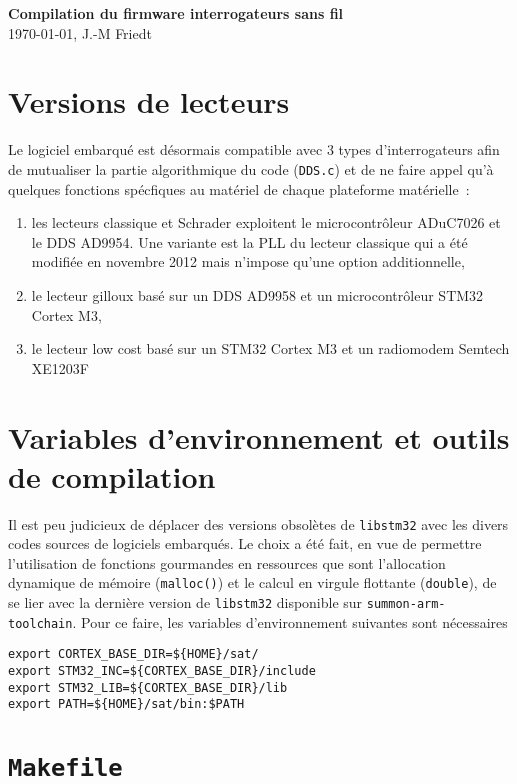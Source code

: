 \documentclass[a4paper]{article}
\begin{document}
\begin{center}
{\Large\bf Compilation du firmware interrogateurs sans fil} \\
\today, J.-M Friedt
\end{center}

\section{Versions de lecteurs}

Le logiciel embarqu\'e est d\'esormais compatible avec 3 types d'interrogateurs afin
de mutualiser la partie algorithmique du code ({\tt DDS.c}) et de ne faire appel
qu'\`a quelques fonctions sp\'ecfiques au mat\'eriel de chaque plateforme mat\'erielle~:
\begin{enumerate}
\item les lecteurs classique et Schrader exploitent le microcontr\^oleur ADuC7026 et le DDS AD9954. Une
variante est la PLL du lecteur classique qui a \'et\'e modifi\'ee en novembre 2012 mais n'impose qu'une option 
additionnelle,
\item le lecteur gilloux bas\'e sur un DDS AD9958 et un microcontr\^oleur STM32 Cortex M3,
\item le lecteur low cost bas\'e sur un STM32 Cortex M3 et un radiomodem Semtech XE1203F
\end{enumerate}

\section{Variables d'environnement et outils de compilation}

Il est peu judicieux de d\'eplacer des versions obsol\`etes de {\tt libstm32} avec les divers
codes sources de logiciels embarqu\'es. Le choix a \'et\'e fait, en vue de permettre l'utilisation
de fonctions gourmandes en ressources que sont l'allocation dynamique de m\'emoire ({\tt malloc()})
et le calcul en virgule flottante ({\tt double}), de se lier avec la derni\`ere version de {\tt libstm32}
disponible sur {\tt summon-arm-toolchain}. Pour ce faire, les variables d'environnement suivantes sont
n\'ecessaires

\begin{verbatim}
export CORTEX_BASE_DIR=${HOME}/sat/
export STM32_INC=${CORTEX_BASE_DIR}/include
export STM32_LIB=${CORTEX_BASE_DIR}/lib
export PATH=${HOME}/sat/bin:$PATH
\end{verbatim}

\section{{\tt Makefile}}
\end{document}
